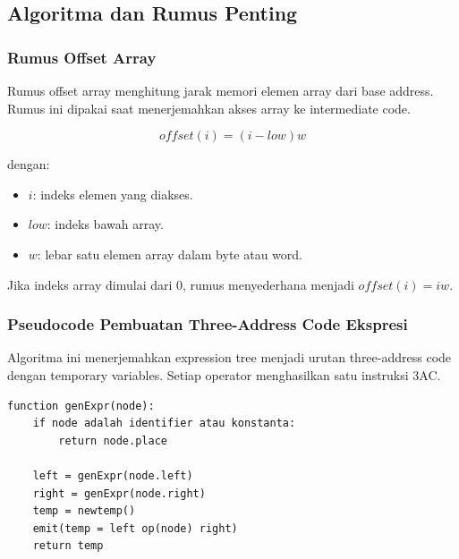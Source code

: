 \subsection{Algoritma dan Rumus Penting}

\subsubsection{Rumus Offset Array}

\begin{jawab}
Rumus offset array menghitung jarak memori elemen array dari base address. Rumus ini dipakai saat menerjemahkan akses array ke intermediate code.
\end{jawab}

\begin{equation}
    offset(i)=(i-low)w
    \label{eq:offset-array-ir}
\end{equation}

dengan:
\begin{itemize}
    \item $i$: indeks elemen yang diakses.
    \item $low$: indeks bawah array.
    \item $w$: lebar satu elemen array dalam byte atau word.
\end{itemize}

Jika indeks array dimulai dari 0, rumus menyederhana menjadi $offset(i)=iw$.

\subsubsection{Pseudocode Pembuatan Three-Address Code Ekspresi}

\begin{jawab}
Algoritma ini menerjemahkan expression tree menjadi urutan three-address code dengan temporary variables. Setiap operator menghasilkan satu instruksi 3AC.
\end{jawab}

\begin{lstlisting}[caption={Pseudocode translasi ekspresi ke three-address code}, label={lst:expr-to-3ac}]
function genExpr(node):
    if node adalah identifier atau konstanta:
        return node.place

    left = genExpr(node.left)
    right = genExpr(node.right)
    temp = newtemp()
    emit(temp = left op(node) right)
    return temp
\end{lstlisting}

